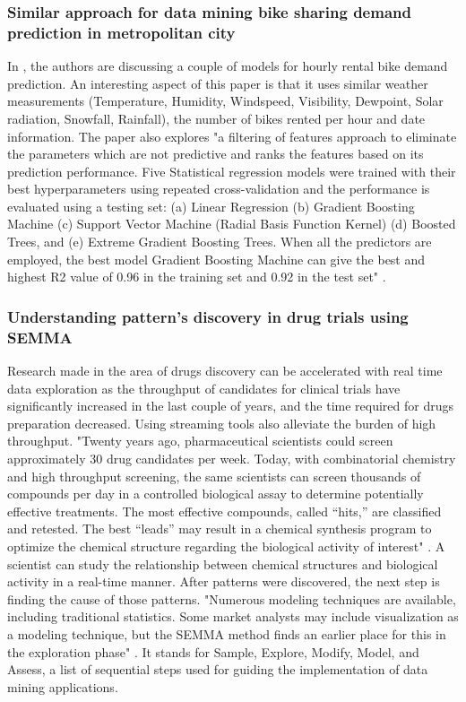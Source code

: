 \subsubsection{Similar approach for data mining bike sharing demand prediction in metropolitan city}

In \cite{E2020353}, the authors are discussing a couple of models for hourly rental bike demand prediction. An interesting aspect of this paper is that it uses similar weather measurements (Temperature, Humidity, Windspeed, Visibility, Dewpoint, Solar radiation, Snowfall, Rainfall), the number of bikes rented per hour and date information. The paper also explores "a filtering of features approach to eliminate the parameters which are not predictive and ranks the features based on its prediction performance. Five Statistical regression models were trained with their best hyperparameters using repeated cross-validation and the performance is evaluated using a testing set: (a) Linear Regression (b) Gradient Boosting Machine (c) Support Vector Machine (Radial Basis Function Kernel) (d) Boosted Trees, and (e) Extreme Gradient Boosting Trees. When all the predictors are employed, the best model Gradient Boosting Machine can give the best and highest R2 value of 0.96 in the training set and 0.92 in the test set" \cite{E2020353}.

\subsubsection{Understanding pattern's discovery in drug trials using SEMMA}

Research made in the area of drugs discovery can be accelerated with real time data exploration as the throughput of candidates for clinical trials have significantly increased in the last couple of years, and the time required for drugs preparation decreased. Using streaming tools also alleviate the burden of high throughput. "Twenty years ago, pharmaceutical scientists could screen approximately 30 drug candidates per week. Today, with combinatorial chemistry and high throughput screening, the same scientists can screen thousands of compounds per day in a controlled biological assay to determine potentially effective treatments. The most effective compounds, called “hits,” are classified and retested. The best “leads” may result in a chemical synthesis program to optimize the chemical structure regarding the biological activity of interest" \cite{hoho}. A scientist can study the relationship between chemical structures and biological activity in a real-time manner. After patterns were discovered, the next step is finding the cause of those patterns. "Numerous modeling techniques are available, including traditional statistics. Some market analysts may include visualization as a modeling technique, but the SEMMA method finds an earlier place for this in the exploration phase" \cite{hoho}. It stands for Sample, Explore, Modify, Model, and Assess, a list of sequential steps used for guiding the implementation of data mining applications.


